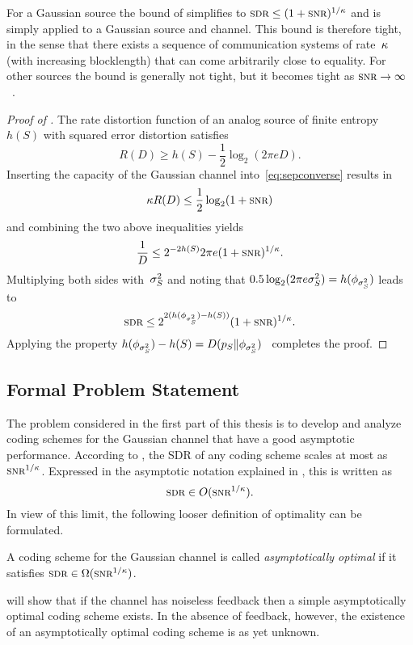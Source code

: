 \begin{remark}
  \label{rem:perflimitgaussiansource}
  For a Gaussian source the bound of  simplifies to $\sdr \le (1 +
  \snr)^{1/\k}$ and is simply  applied to a Gaussian
  source and channel. This bound is therefore tight, in the sense that there
  exists a sequence of communication systems of rate~$\kappa$ (with increasing
  blocklength) that can come arbitrarily close to equality. 
  For other sources the bound is generally not tight, but it becomes tight as
  $\snr \ra \infty$~\cite{LinderZ1994}.
\end{remark}

\begin{proof}[Proof of ]
  The rate distortion function of an analog source of finite entropy~$h(S)$
  with squared error distortion satisfies~\cite{Shannon1959}
  \begin{equation*}
    R(D) \ge h(S) - \frac12 \log_2(2\pi e D).
  \end{equation*}
  Inserting the capacity of the Gaussian channel into~\eqref{eq:sepconverse}
  results in
  \begin{equation*}
    \k R(D) \le \frac12 \log_2(1 + \snr)
  \end{equation*}
  and combining the two above inequalities yields
  \begin{equation*}
    \frac1D \le 2^{-2h(S)} 2\pi e (1 + \snr)^{1/\k}.
  \end{equation*}
  Multiplying both sides with~${\sigma_S^2}$ and noting that $0.5 \log_2(2\pi e {\sigma_S^2}) =
  h(\phi_{{\sigma_S^2}})$ leads to
  \begin{equation*}
    \sdr \le 2^{2(h(\phi_{\ssq}) - h(S))} (1 + \snr)^{1/\k}.
  \end{equation*}
  Applying the property $h(\phi_{{\sigma_S^2}}) - h(S) = D({p_S} \|
  \phi_{{\sigma_S^2}})$~\cite[Theorem~8.6.5]{CoverT1991} completes the proof.
\end{proof}


\subsection{Formal Problem Statement}

The problem considered in the first part of this thesis is to develop and
analyze coding schemes for the Gaussian channel that have a good asymptotic
performance. According to , the SDR of any coding scheme scales
at most as $\snr^{1/\k}$. Expressed in the asymptotic notation explained in
, this is written as
\begin{equation*}
  \sdr \in O(\snr^{1/\k}).
\end{equation*}
In view of this limit, the following looser definition of optimality can be
formulated. 
\begin{definition}
  A coding scheme for the Gaussian channel is called \emph{asymptotically
  optimal} if it satisfies $\sdr \in \Omega(\snr^{1/\k})$.
\end{definition}
 will show that if the channel has noiseless feedback then a
simple asymptotically optimal coding scheme exists. In the absence of feedback,
however, the existence of an asymptotically optimal coding scheme is as yet
unknown.

